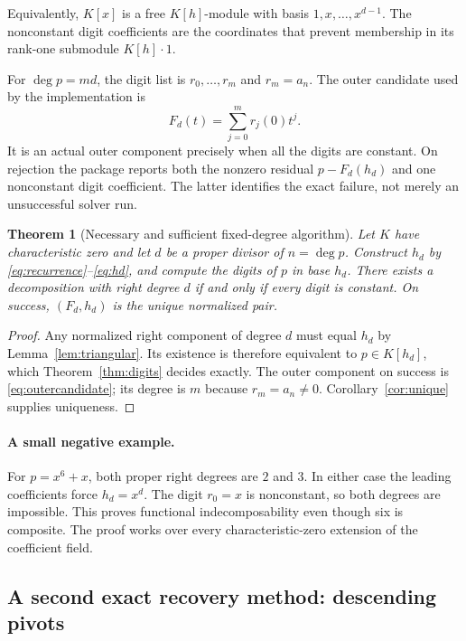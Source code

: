 \documentclass[11pt,a4paper]{article}
\numberwithin{equation}{section}
\newtheorem{theorem}{Theorem}[section]
\theoremstyle{definition}
\theoremstyle{remark}
\begin{document}
Equivalently, $K[x]$ is a free $K[h]$-module with basis
$1,x,\ldots,x^{d-1}$. The nonconstant digit coefficients are the coordinates
that prevent membership in its rank-one submodule $K[h]\cdot1$.

For $\deg p=md$, the digit list is $r_0,\ldots,r_m$ and $r_m=a_n$.
The outer candidate used by the implementation is
\begin{equation}
 F_d(t)=\sum_{j=0}^{m}r_j(0)t^j.
 \label{eq:outercandidate}
\end{equation}
It is an actual outer component precisely when all the digits are constant.
On rejection the package reports both the nonzero residual $p-F_d(h_d)$ and
one nonconstant digit coefficient. The latter identifies the exact failure,
not merely an unsuccessful solver run.

\begin{theorem}[Necessary and sufficient fixed-degree algorithm]
\label{thm:fixed}
Let $K$ have characteristic zero and let $d$ be a proper divisor of
$n=\deg p$. Construct $h_d$ by \eqref{eq:recurrence}--\eqref{eq:hd}, and
compute the digits of $p$ in base $h_d$. There exists a decomposition with
right degree $d$ if and only if every digit is constant. On success,
$(F_d,h_d)$ is the unique normalized pair.
\end{theorem}
\begin{proof}
Any normalized right component of degree $d$ must equal $h_d$ by
Lemma~\ref{lem:triangular}. Its existence is therefore equivalent to
$p\in K[h_d]$, which Theorem~\ref{thm:digits} decides exactly. The outer
component on success is \eqref{eq:outercandidate}; its degree is $m$ because
$r_m=a_n\ne0$. Corollary~\ref{cor:unique} supplies uniqueness.
\end{proof}

\paragraph{A small negative example.}
For $p=x^6+x$, both proper right degrees are $2$ and $3$. In either case the
leading coefficients force $h_d=x^d$. The digit $r_0=x$ is nonconstant, so
both degrees are impossible. This proves functional indecomposability even
though six is composite. The proof works over every characteristic-zero
extension of the coefficient field.

\subsection{A second exact recovery method: descending pivots}
\end{document}
